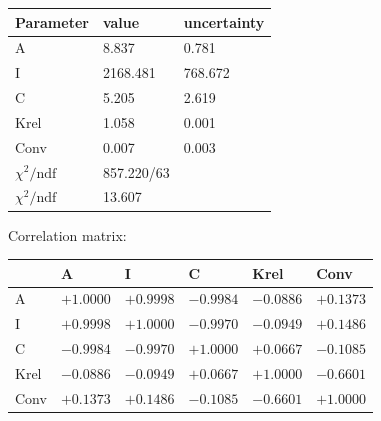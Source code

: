 \begin{tabular}{l|ll}
Parameter & value & uncertainty \\ \hline
 A & 8.837 & 0.781 \\ 
 I & 2168.481 & 768.672 \\ 
 C & 5.205 & 2.619 \\ 
 Krel & 1.058 & 0.001 \\ 
 Conv & 0.007 & 0.003 \\ 
 \hline
 $\chi^2/\mathrm{ndf}$ & 857.220/63 & \\
 $\chi^2/\mathrm{ndf}$ & 13.607 & \\
\end{tabular}

Correlation matrix:

\begin{tabular}{l|lllll} 
 & A & I & C & Krel & Conv \\ \hline
 A & $+1.0000$ & $+0.9998$ & $-0.9984$ & $-0.0886$ & $+0.1373$ \\ 
 I & $+0.9998$ & $+1.0000$ & $-0.9970$ & $-0.0949$ & $+0.1486$ \\ 
 C & $-0.9984$ & $-0.9970$ & $+1.0000$ & $+0.0667$ & $-0.1085$ \\ 
 Krel & $-0.0886$ & $-0.0949$ & $+0.0667$ & $+1.0000$ & $-0.6601$ \\ 
 Conv & $+0.1373$ & $+0.1486$ & $-0.1085$ & $-0.6601$ & $+1.0000$ \\ 
\end{tabular}
